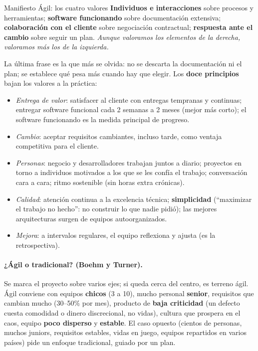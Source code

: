 \documentclass[11pt,a4paper]{article}
\begin{document}
\begin{defbox}{Manifiesto Ágil: los cuatro valores}
\textbf{Individuos e interacciones} sobre procesos y herramientas; \textbf{software funcionando} sobre
documentación extensiva; \textbf{colaboración con el cliente} sobre negociación contractual; \textbf{respuesta
ante el cambio} sobre seguir un plan. \emph{Aunque valoramos los elementos de la derecha, valoramos más los de
la izquierda.}
\end{defbox}
La última frase es la que más se olvida: no se descarta la documentación ni el plan; se establece qué pesa más
cuando hay que elegir. Los \textbf{doce principios} bajan los valores a la práctica:
\begin{itemize}
  \item \emph{Entrega de valor}: satisfacer al cliente con entregas tempranas y continuas; entregar software
  funcional cada 2 semanas a 2 meses (mejor más corto); el software funcionando es la medida principal de
  progreso.
  \item \emph{Cambio}: aceptar requisitos cambiantes, incluso tarde, como ventaja competitiva para el cliente.
  \item \emph{Personas}: negocio y desarrolladores trabajan juntos a diario; proyectos en torno a individuos
  motivados a los que se les confía el trabajo; conversación cara a cara; ritmo sostenible (sin horas extra
  crónicas).
  \item \emph{Calidad}: atención continua a la excelencia técnica; \textbf{simplicidad} (``maximizar el trabajo
  no hecho'': no construir lo que nadie pidió); las mejores arquitecturas surgen de equipos autoorganizados.
  \item \emph{Mejora}: a intervalos regulares, el equipo reflexiona y ajusta (es la retrospectiva).
\end{itemize}

\paragraph{¿Ágil o tradicional? (Boehm y Turner).} Se marca el proyecto sobre varios ejes; si queda cerca del
centro, es terreno ágil. Ágil conviene con equipos \textbf{chicos} (3 a 10), mucho personal \textbf{senior},
requisitos que cambian mucho (30--50\% por mes), producto de \textbf{baja criticidad} (un defecto cuesta
comodidad o dinero discrecional, no vidas), cultura que prospera en el caos, equipo \textbf{poco disperso} y
\textbf{estable}. El caso opuesto (cientos de personas, muchos juniors, requisitos estables, vidas en juego,
equipos repartidos en varios países) pide un enfoque tradicional, guiado por un plan.
\end{document}
